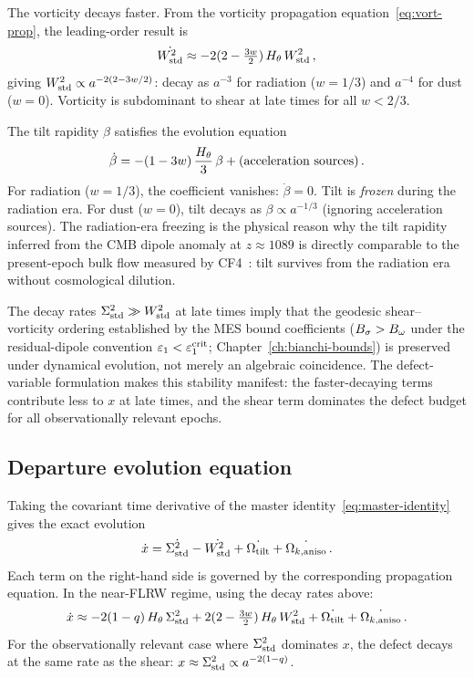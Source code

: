 The vorticity decays faster.  From the vorticity propagation
equation~\eqref{eq:vort-prop}, the leading-order result is
\begin{equation}\label{eq:Wstd-dot}
\dot{W^2_{\mathrm{std}}} \approx -2(2 - \tfrac{3w}{2})\,H_\theta\,W^2_{\mathrm{std}}\,,
\end{equation}
giving $W^2_{\mathrm{std}} \propto a^{-2(2-3w/2)}$: decay as $a^{-3}$ for
radiation ($w = 1/3$) and $a^{-4}$ for dust ($w = 0$).  Vorticity
is subdominant to shear at late times for all $w < 2/3$.

The tilt rapidity $\beta$ satisfies the evolution equation
\begin{equation}\label{eq:beta-dot}
\dot{\beta}
= -(1 - 3w)\,\frac{H_\theta}{3}\,\beta
  + (\text{acceleration sources})\,.
\end{equation}
For radiation ($w = 1/3$), the coefficient vanishes:
$\dot{\beta} = 0$.  Tilt is \emph{frozen} during the
radiation era.  For dust ($w = 0$), tilt decays as $\beta
\propto a^{-1/3}$ (ignoring acceleration sources).  The
radiation-era freezing is the physical reason why the tilt
rapidity inferred from the CMB dipole anomaly at $z \approx
1089$ is directly comparable to the present-epoch bulk flow
measured by CF4~\cite{Watkins2023}: tilt survives from the
radiation era without cosmological dilution.

\begin{remark}
\label{rem:hierarchy-conservation}
The decay rates $\Sigma^2_{\mathrm{std}} \gg W^2_{\mathrm{std}}$ at late times
imply that the geodesic shear--vorticity ordering established by the
MES bound coefficients ($B_\sigma > B_\omega$ under the residual-dipole
convention $\varepsilon_1 < \varepsilon_1^{\mathrm{crit}}$;
Chapter~\ref{ch:bianchi-bounds}) is preserved under dynamical
evolution, not merely an algebraic coincidence.  The
defect-variable formulation makes this stability manifest:
the faster-decaying terms contribute less to $x$ at late times,
and the shear term dominates the defect budget for all
observationally relevant epochs.
\end{remark}


\subsection{Departure evolution equation}\label{sec:defect-evol}

Taking the covariant time derivative of the master
identity~\eqref{eq:master-identity} gives the exact evolution
\begin{equation}\label{eq:xdot}
\dot{x} = \dot{\Sigma^2_{\mathrm{std}}} - \dot{W^2_{\mathrm{std}}}
  + \dot{\Omega_{\mathrm{tilt}}} + \dot{\Omega_{k,\mathrm{aniso}}}\,.
\end{equation}
Each term on the right-hand side is governed by the
corresponding propagation equation.  In the near-FLRW regime,
using the decay rates above:
\begin{equation}\label{eq:xdot-approx}
\dot{x} \approx -2(1 - q)\,H_\theta\,\Sigma^2_{\mathrm{std}}
  + 2(2 - \tfrac{3w}{2})\,H_\theta\,W^2_{\mathrm{std}}
  + \dot{\Omega_{\mathrm{tilt}}} + \dot{\Omega_{k,\mathrm{aniso}}}\,.
\end{equation}
For the observationally relevant case where $\Sigma^2_{\mathrm{std}}$
dominates $x$, the defect decays at the same rate as the
shear: $x \approx \Sigma^2_{\mathrm{std}} \propto a^{-2(1-q)}$.

